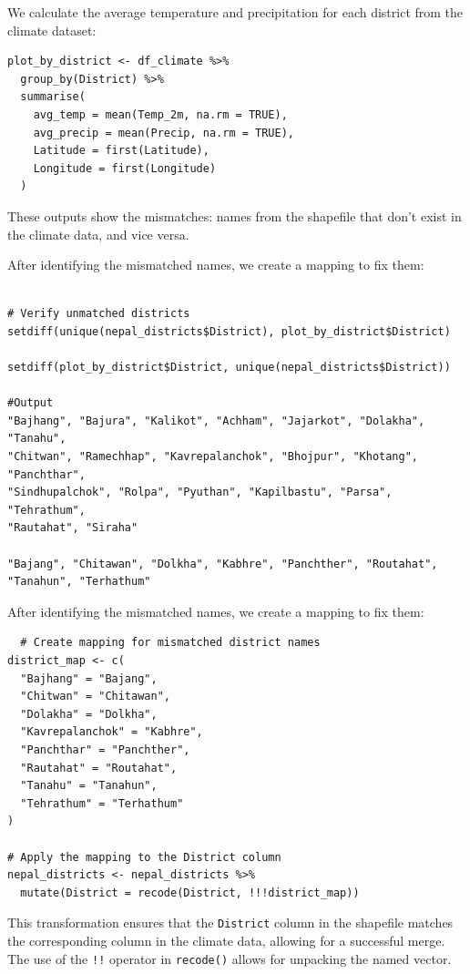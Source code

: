 We calculate the average temperature and precipitation for each district from the climate dataset:

\begin{verbatim}
plot_by_district <- df_climate %>%
  group_by(District) %>%
  summarise(
    avg_temp = mean(Temp_2m, na.rm = TRUE),
    avg_precip = mean(Precip, na.rm = TRUE),
    Latitude = first(Latitude),
    Longitude = first(Longitude)
  )
\end{verbatim}

These outputs show the mismatches: names from the shapefile that don’t exist in the climate data, and vice versa.

After identifying the mismatched names, we create a mapping to fix them:

\begin{verbatim}

# Verify unmatched districts
setdiff(unique(nepal_districts$District), plot_by_district$District)

setdiff(plot_by_district$District, unique(nepal_districts$District))

#Output
"Bajhang", "Bajura", "Kalikot", "Achham", "Jajarkot", "Dolakha", "Tanahu",
"Chitwan", "Ramechhap", "Kavrepalanchok", "Bhojpur", "Khotang", "Panchthar", 
"Sindhupalchok", "Rolpa", "Pyuthan", "Kapilbastu", "Parsa", "Tehrathum",
"Rautahat", "Siraha"

"Bajang", "Chitawan", "Dolkha", "Kabhre", "Panchther", "Routahat", 
"Tanahun", "Terhathum"
\end{verbatim}

After identifying the mismatched names, we create a mapping to fix them:
\begin{verbatim}
  # Create mapping for mismatched district names
district_map <- c(
  "Bajhang" = "Bajang",
  "Chitwan" = "Chitawan",
  "Dolakha" = "Dolkha",
  "Kavrepalanchok" = "Kabhre",
  "Panchthar" = "Panchther",
  "Rautahat" = "Routahat",
  "Tanahu" = "Tanahun",
  "Tehrathum" = "Terhathum"
)

# Apply the mapping to the District column
nepal_districts <- nepal_districts %>%
  mutate(District = recode(District, !!!district_map))
\end{verbatim}

This transformation ensures that the \texttt{District} column in the shapefile matches the corresponding column in the climate data, allowing for a successful merge. The use of the \texttt{!!} operator in \texttt{recode()} allows for unpacking the named vector.

